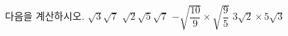 다음을 계산하시오.
 $\sqrt{3}\sqrt{7}$
 $\sqrt{2}\sqrt{5}\sqrt{7}$
 $-\sqrt{\dfrac{10}{9}}\times\sqrt{\dfrac{9}{5}}$
 $3\sqrt{2}\times 5\sqrt{3}$
